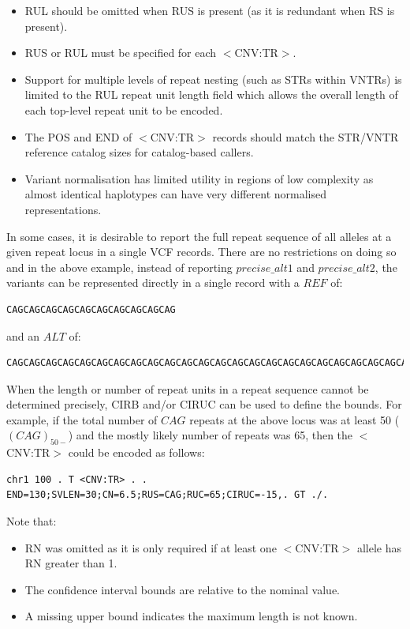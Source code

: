 \documentclass[8pt]{article}
\begin{document}
\begin{itemize}
    \item RUL should be omitted when RUS is present (as it is redundant when RS is present).
    \item RUS or RUL must be specified for each $<$CNV:TR$>$.
    \item Support for multiple levels of repeat nesting (such as STRs within VNTRs) is limited to the RUL repeat unit length field which allows the overall length of each top-level repeat unit to be encoded.
    \item The POS and END of $<$CNV:TR$>$ records should match the STR/VNTR reference catalog sizes for catalog-based callers.
    \item Variant normalisation has limited utility in regions of low complexity as almost identical haplotypes can have very different normalised representations.
\end{itemize}

In some cases, it is desirable to report the full repeat sequence of all alleles at a given repeat locus in a single VCF records.
There are no restrictions on doing so and in the above example, instead of reporting $precise\_alt1$ and $precise\_alt2$, the variants can be represented directly in a single record with a $REF$ of:
\scriptsize
\begin{verbatim}
CAGCAGCAGCAGCAGCAGCAGCAGCAGCAG
\end{verbatim}
\normalsize
and an $ALT$ of:
\scriptsize
\begin{verbatim}
CAGCAGCAGCAGCAGCAGCAGCAGCAGCAGCAGCAGCAGCAGCAGCAGCAGCAGCAGCAGCAGCAGCAGCAGCAGCAGCAGCAGCAGCAG,CAGCAGCAGCAGCAGCACAGCAGCAGCAG
\end{verbatim}
\normalsize

When the length or number of repeat units in a repeat sequence cannot be determined precisely, CIRB and/or CIRUC can be used to define the bounds.
For example, if the total number of $CAG$ repeats at the above locus was at least 50 ($(CAG)_{50-}$) and the mostly likely number of repeats was 65, then the $<$CNV:TR$>$ could be encoded as follows:

\footnotesize
\begin{verbatim}
chr1 100 . T <CNV:TR> . . END=130;SVLEN=30;CN=6.5;RUS=CAG;RUC=65;CIRUC=-15,. GT ./.
\end{verbatim}
\normalsize

Note that:
\begin{itemize}
	\item RN was omitted as it is only required if at least one $<$CNV:TR$>$ allele has RN greater than 1.
	\item The confidence interval bounds are relative to the nominal value.
	\item A missing upper bound indicates the maximum length is not known.
\end{itemize}
\end{document}
